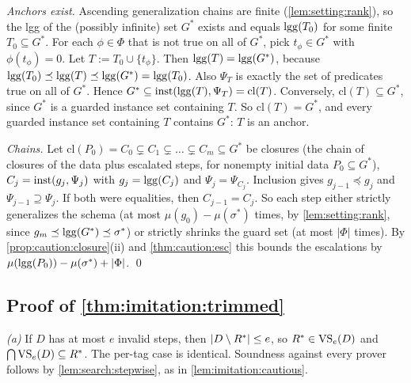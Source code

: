 \emph{Anchors exist.} Ascending generalization chains are finite (\cref{lem:setting:rank}), so the lgg of the (possibly infinite) set $G^*$ exists and equals $\mathrm{lgg}(T_0)$ for some finite $T_0\subseteq G^*$. For each $\phi\in\Phi$ that is not true on all of $G^*$, pick $t_\phi\in G^*$ with $\phi(t_\phi)=0$. Let $T:=T_0\cup\{t_\phi\}$. Then $\mathrm{lgg}(T)=\mathrm{lgg}(G^*)$, because $\mathrm{lgg}(T_0)\preceq\mathrm{lgg}(T)\preceq\mathrm{lgg}(G^*)=\mathrm{lgg}(T_0)$. Also $\Psi_T$ is exactly the set of predicates true on all of $G^*$. Hence $G^*\subseteq\mathrm{inst}(\mathrm{lgg}(T),\Psi_T)=\mathrm{cl}(T)$. Conversely, $\mathrm{cl}(T)\subseteq G^*$, since $G^*$ is a guarded instance set containing $T$. So $\mathrm{cl}(T)=G^*$, and every guarded instance set containing $T$ contains $G^*$: $T$ is an anchor.

\emph{Chains.} Let $\mathrm{cl}(P_0)=C_0\subsetneq C_1\subsetneq\dots\subsetneq C_m\subseteq G^*$ be closures (the chain of closures of the data plus escalated steps, for nonempty initial data $P_0\subseteq G^*$), $C_j=\mathrm{inst}(g_j,\Psi_j)$ with $g_j=\mathrm{lgg}(C_j)$ and $\Psi_j=\Psi_{C_j}$. Inclusion gives $g_{j-1}\preceq g_j$ and $\Psi_{j-1}\supseteq\Psi_j$. If both were equalities, then $C_{j-1}=C_j$. So each step either strictly generalizes the schema (at most $\mu(g_0)-\mu(\sigma^*)$ times, by \cref{lem:setting:rank}, since $g_m\preceq\mathrm{lgg}(G^*)\preceq\sigma^*$) or strictly shrinks the guard set (at most $|\Phi|$ times). By \cref{prop:caution:closure}(ii) and \cref{thm:caution:esc} this bounds the escalations by $\mu(\mathrm{lgg}(P_0))-\mu(\sigma^*)+|\Phi|$. \qed

\subsection{Proof of \texorpdfstring{\cref{thm:imitation:trimmed}}{the trimmed version space theorem}}\label{app:imitation:trimmed}

\emph{(a)} If $D$ has at most $e$ invalid steps, then $|D\setminus R^{*}|\le e$, so $R^{*}\in\mathrm{VS}_e(D)$ and $\bigcap\mathrm{VS}_e(D)\subseteq R^{*}$. The per-tag case is identical. Soundness against every prover follows by \cref{lem:search:stepwise}, as in \cref{lem:imitation:cautious}.

